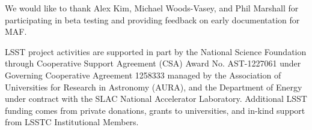 \documentclass[]{spie}  %
\begin{document}
\acknowledgments     %

We would like to thank Alex Kim, Michael Woods-Vasey, and Phil Marshall for participating in beta testing and providing feedback on early documentation for MAF. 

LSST project activities are supported in part by the National Science Foundation through Cooperative Support Agreement (CSA) Award No. AST-1227061 under Governing Cooperative Agreement 1258333 managed by the Association of Universities for Research in Astronomy (AURA), and the Department of Energy under contract with the SLAC National Accelerator Laboratory.   Additional LSST funding comes from private donations, grants to universities, and in-kind support from LSSTC Institutional Members.



\end{document}
